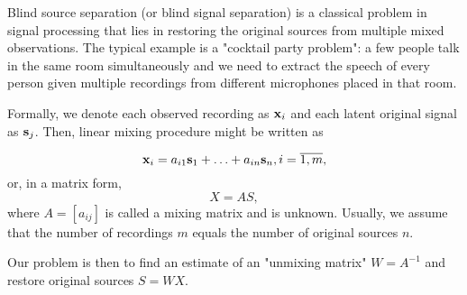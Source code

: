 \documentclass[../main.tex]{subfiles} %
\begin{document}
Blind source separation (or blind signal separation) is a classical problem in signal processing that lies in restoring the original sources from multiple mixed observations. The typical example is a "cocktail party problem": a few people talk in the same room simultaneously and we need to extract the speech of every person given multiple recordings from different microphones placed in that room.

Formally, we denote  each observed recording as ${\mathbf x}_i$ and each latent original signal as ${\mathbf s}_j$. Then, linear mixing procedure might be written as 

\[ {\mathbf x}_i = a_{i1} {\mathbf s}_1 + \ldots + a_{in} {\mathbf s}_n, i = \overline{1, m}, \]
or, in a matrix form, 
\[ X = A S, \]
where $A = \left[a_{ij} \right]$ is called a mixing matrix and is unknown. Usually, we assume that the number of recordings $m$ equals the number of original sources $n$.

Our problem is then to find an estimate of an "unmixing matrix" $W = A^{-1}$  and restore original sources $S = W X$.
 
\end{document}
